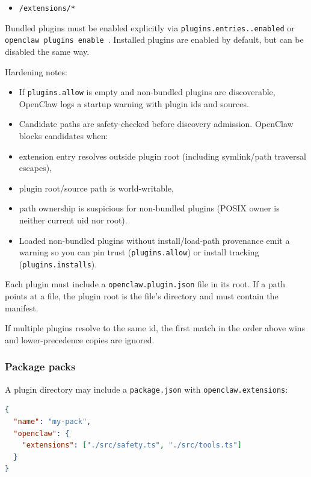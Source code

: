 \begin{itemize}
  \item \texttt{/extensions/*}
\end{itemize}


Bundled plugins must be enabled explicitly via \texttt{plugins.entries..enabled}
or \texttt{openclaw plugins enable }. Installed plugins are enabled by default,
but can be disabled the same way.

Hardening notes:

\begin{itemize}
  \item If \texttt{plugins.allow} is empty and non-bundled plugins are discoverable, OpenClaw logs a startup warning with plugin ids and sources.
  \item Candidate paths are safety-checked before discovery admission. OpenClaw blocks candidates when:
  \item extension entry resolves outside plugin root (including symlink/path traversal escapes),
  \item plugin root/source path is world-writable,
  \item path ownership is suspicious for non-bundled plugins (POSIX owner is neither current uid nor root).
  \item Loaded non-bundled plugins without install/load-path provenance emit a warning so you can pin trust (\texttt{plugins.allow}) or install tracking (\texttt{plugins.installs}).
\end{itemize}


Each plugin must include a \texttt{openclaw.plugin.json} file in its root. If a path
points at a file, the plugin root is the file's directory and must contain the
manifest.

If multiple plugins resolve to the same id, the first match in the order above
wins and lower-precedence copies are ignored.

\subsubsection{Package packs}


A plugin directory may include a \texttt{package.json} with \texttt{openclaw.extensions}:

\begin{lstlisting}[language=json]
{
  "name": "my-pack",
  "openclaw": {
    "extensions": ["./src/safety.ts", "./src/tools.ts"]
  }
}
\end{lstlisting}


